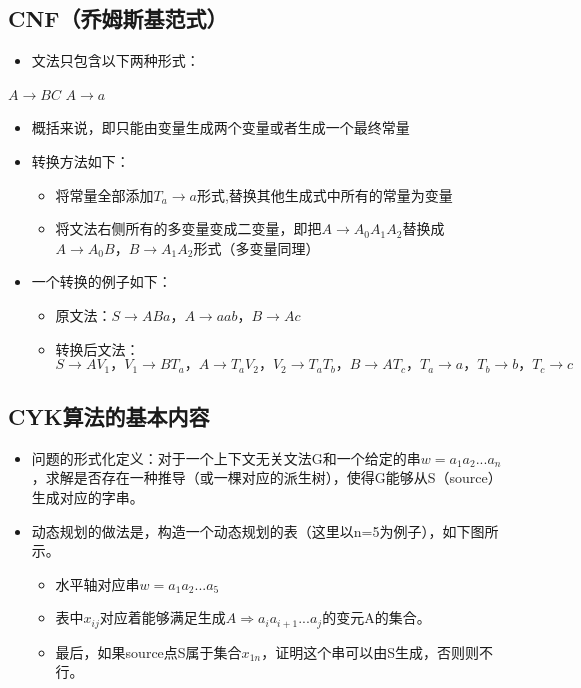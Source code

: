 \subsection{CNF（乔姆斯基范式）}\label{header-n1201}

\begin{itemize}
\item
  文法只包含以下两种形式：
\end{itemize}

\(A\rightarrow BC\) \quad
\(A\rightarrow a\)

\begin{itemize}
\item
  概括来说，即只能由变量生成两个变量或者生成一个最终常量
\item
  转换方法如下：

  \begin{itemize}
  \item
    将常量全部添加\(T_a\rightarrow a\)形式,替换其他生成式中所有的常量为变量
  \item
    将文法右侧所有的多变量变成二变量，即把\(A\rightarrow A_0A_1A_2\)替换成\(A\rightarrow A_0B，B\rightarrow A_1A_2\)形式（多变量同理）
  \end{itemize}
\item
  一个转换的例子如下：

  \begin{itemize}
  \item
    原文法：\(S\rightarrow ABa，A\rightarrow aab，B\rightarrow Ac\)
  \item
    转换后文法：\(S\rightarrow AV_1，V_1\rightarrow BT_a，A\rightarrow T_aV_2，V_2\rightarrow T_aT_b，B\rightarrow AT_c，T_a\rightarrow a，T_b\rightarrow b，T_c\rightarrow c\)
  \end{itemize}
\end{itemize}

\subsection{CYK算法的基本内容}\label{header-n1224}

\begin{itemize}
\item
  问题的形式化定义：对于一个上下文无关文法G和一个给定的串\(w=a_1a_2...a_n\)，求解是否存在一种推导（或一棵对应的派生树），使得G能够从S（source）生成对应的字串。
\item
  动态规划的做法是，构造一个动态规划的表（这里以n=5为例子），如下图所示。

  \begin{itemize}
  \item
    水平轴对应串\(w=a_1a_2...a_5\)
  \item
    表中\(x_{ij}\)对应着能够满足生成\(A\Rightarrow a_ia_{i+1}...a_j\)的变元A的集合。
  \item
    最后，如果source点S属于集合\(x_{1n}\)，证明这个串可以由S生成，否则则不行。
  \end{itemize}
\end{itemize}

